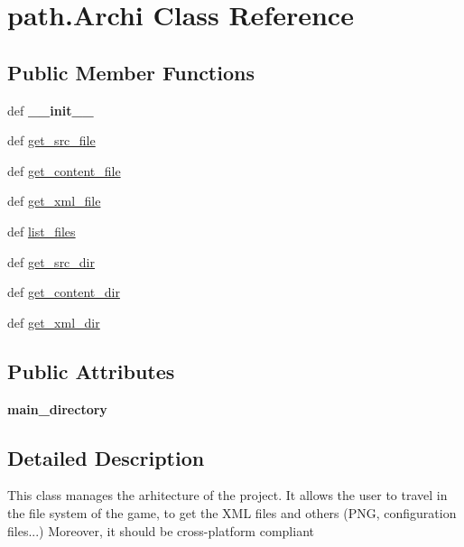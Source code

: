\hypertarget{classpath_1_1_archi}{\section{path.\-Archi \-Class \-Reference}
\label{classpath_1_1_archi}
}
\subsection*{\-Public \-Member \-Functions}
\begin{DoxyCompactItemize}
\item 
\hypertarget{classpath_1_1_archi_aa6df8d47c7300211ba330a8ad2c37e4d}{def {\bfseries \-\_\-\-\_\-init\-\_\-\-\_\-}}\label{classpath_1_1_archi_aa6df8d47c7300211ba330a8ad2c37e4d}

\item 
def \hyperlink{classpath_1_1_archi_a1dc5f761b2aa6edc73d9f08ab70ac098}{get\-\_\-src\-\_\-file}
\item 
def \hyperlink{classpath_1_1_archi_af5711c8679949fb91ce72b36181ad3dc}{get\-\_\-content\-\_\-file}
\item 
def \hyperlink{classpath_1_1_archi_a833a9e6f4fdc1970f641a0421659bd4b}{get\-\_\-xml\-\_\-file}
\item 
def \hyperlink{classpath_1_1_archi_af109944f278260b344c20fec9d63efcb}{list\-\_\-files}
\item 
def \hyperlink{classpath_1_1_archi_a86a72cf134364d99b09302a8acddc086}{get\-\_\-src\-\_\-dir}
\item 
def \hyperlink{classpath_1_1_archi_ade0a8aea87de26b63ecfd9129e7d02f8}{get\-\_\-content\-\_\-dir}
\item 
def \hyperlink{classpath_1_1_archi_acd1b663ed5d2cce1bd0b46b834a9d4f5}{get\-\_\-xml\-\_\-dir}
\end{DoxyCompactItemize}
\subsection*{\-Public \-Attributes}
\begin{DoxyCompactItemize}
\item 
\hypertarget{classpath_1_1_archi_adc47f4b851130667d6ee16298dde6537}{{\bfseries main\-\_\-directory}}\label{classpath_1_1_archi_adc47f4b851130667d6ee16298dde6537}

\end{DoxyCompactItemize}


\subsection{\-Detailed \-Description}
\begin{DoxyVerb}
This class manages the arhitecture of the project.
It allows the user to travel in the file system of the game, to get
the XML files and others (PNG, configuration files...)
Moreover, it should be cross-platform compliant
\end{DoxyVerb}
 

